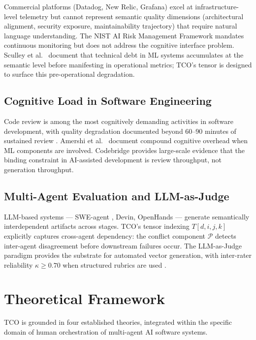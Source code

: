 \documentclass[manuscript,review,anonymous]{acmart}
\begin{document}
Commercial platforms (Datadog, New Relic, Grafana) excel at infrastructure-level
telemetry but cannot represent semantic quality dimensions
(architectural alignment, security exposure, maintainability trajectory) that require
natural language understanding. The NIST AI Risk Management Framework \cite{nist2023rmf}
mandates continuous monitoring but does not address the cognitive interface problem.
Sculley et al.\ \cite{sculley2015} document that technical debt in ML systems
accumulates at the semantic level before manifesting in operational metrics; TCO's
tensor is designed to surface this pre-operational degradation.

\subsection{Cognitive Load in Software Engineering}

Code review is among the most cognitively demanding activities in software development,
with quality degradation documented beyond 60--90 minutes of sustained review
\cite{sweller2011}. Amershi et al.\ \cite{amershi2019} document compound cognitive
overhead when ML components are involved. Codebridge \cite{codebridge2025} provides
large-scale evidence that the binding constraint in AI-assisted development is review
throughput, not generation throughput.

\subsection{Multi-Agent Evaluation and LLM-as-Judge}

LLM-based systems --- SWE-agent \cite{sweagent2024}, Devin, OpenHands --- generate
semantically interdependent artifacts across stages. TCO's tensor indexing
$T[d, i, j, k]$ explicitly captures cross-agent dependency: the conflict component
$\mathcal{P}$ detects inter-agent disagreement before downstream failures occur.
The LLM-as-Judge paradigm \cite{llmjudge2025winlp,llminterrater2025,llmjudgeempirical2025}
provides the substrate for automated vector generation, with inter-rater reliability
$\kappa \geq 0.70$ when structured rubrics are used \cite{llminterrater2025}.

\section{Theoretical Framework}

TCO is grounded in four established theories, integrated within the specific domain of
human orchestration of multi-agent AI software systems.
\end{document}
